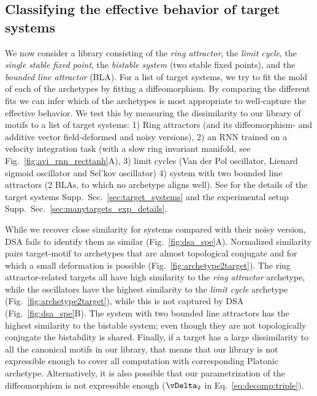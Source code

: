 \documentclass{article}
\theoremstyle{definition} \newtheorem{definition}{Definition}  \newtheorem{example}{Example}
\theoremstyle{remark} \newtheorem{remark}{Remark}
\newcounter{ct}
\begin{document}
\subsection{Classifying the effective behavior of target systems}\label{sec:target_demonstrations}
We now consider a library consisting of the \emph{ring attractor}, the \emph{limit cycle}, the \emph{single stable fixed point}, the \emph{bistable system} (two stable fixed points), and the \emph{bounded line attractor} (BLA).
For a list of target systems, we try to fit the mold of each of the archetypes by fitting a diffeomorphism.
By comparing the different fits we can infer which of the archetypes is most appropriate to well-capture the effective behavior.
We test this by measuring the dissimilarity to our library of motifs to a list of target systems:
1) Ring attractors (and its diffeomorphism- and additive vector field-deformed and noisy versions),
2) an RNN trained on a velocity integration task (with a slow ring invariant manifold, see Fig.~\ref{fig:avi_rnn_recttanh}A),
3) limit cycles (Van der Pol oscillator, Lienard sigmoid oscillator and Sel'kov oscillator)
4) system with two bounded line attractors (2 BLAs, to which no archetype aligns well).
See for the details of the target systems Supp.~Sec.~\ref{sec:target_systems} and the experimental setup Supp.~Sec.~\ref{sec:manytargets_exp_details}.


While we recover close similarity for systems compared with their noisy version, DSA fails to identify them as similar (Fig.~\ref{fig:dsa_spe}A).
Normalized similarity pairs target-motif to archetypes that are almost topological conjugate and for which a small deformation is possible (Fig.~\ref{fig:archetype2target}). 
The ring attractor-related targets all have high similarity to the \emph{ring attractor} archetype, while the oscillators have the highest similarity to the \emph{limit cycle} archetype (Fig.~\ref{fig:archetype2target}), while this is not captured by DSA (Fig.~\ref{fig:dsa_spe}B). 
The system with two bounded line attractors has the highest similarity to the bistable system; even though they are not topologically conjugate the bistability is shared.
Finally, if a target has a large dissimilarity to all the canonical motifs in our library, that means that our library is not expressible enough to cover all computation with corresponding Platonic archetype.
Alternatively, it is also possible that our parametrization of the diffeomorphism is not expressible enough ($\vDelta_2$ in Eq.~\ref{eq:decomp:triple}).
\end{document}
